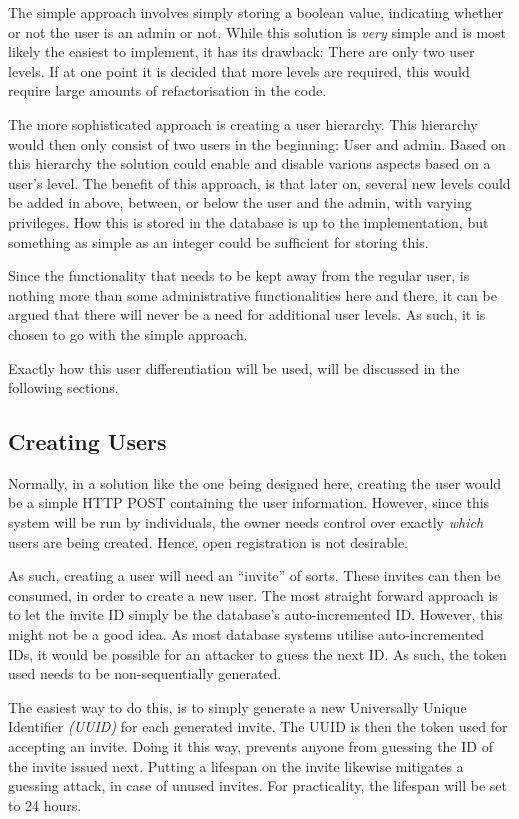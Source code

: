 		The simple approach involves simply storing a boolean value, indicating whether or not the user is an admin or not. While this solution is \emph{very} simple and is most likely the easiest to implement, it has its drawback: There are only two user levels. If at one point it is decided that more levels are required, this would require large amounts of refactorisation in the code.

		The more sophisticated approach is creating a user hierarchy. This hierarchy would then only consist of two users in the beginning: User and admin. Based on this hierarchy the solution could enable and disable various aspects based on a user's level. The benefit of this approach, is that later on, several new levels could be added in above, between, or below the user and the admin, with varying privileges. How this is stored in the database is up to the implementation, but something as simple as an integer could be sufficient for storing this.

		Since the functionality that needs to be kept away from the regular user, is nothing more than some administrative functionalities here and there, it can be argued that there will never be a need for additional user levels. As such, it is chosen to go with the simple approach. 

		Exactly how this user differentiation will be used, will be discussed in the following sections.

		\subsection{Creating Users}	
			Normally, in a solution like the one being designed here, creating the user would be a simple HTTP POST containing the user information. However, since this system will be run by individuals, the owner needs control over exactly \emph{which} users are being created. Hence, open registration is not desirable.

			As such, creating a user will need an ``invite'' of sorts. These invites can then be consumed, in order to create a new user. The most straight forward approach is to let the invite ID simply be the database's auto-incremented ID. However, this might not be a good idea. As most database systems utilise auto-incremented IDs, it would be possible for an attacker to guess the next ID. As such, the token used needs to be non-sequentially generated.

			The easiest way to do this, is to simply generate a new Universally Unique Identifier \emph{(UUID)} for each generated invite. The UUID is then the token used for accepting an invite. Doing it this way, prevents anyone from guessing the ID of the invite issued next. Putting a lifespan on the invite likewise mitigates a guessing attack, in case of unused invites. For practicality, the lifespan will be set to 24 hours.

